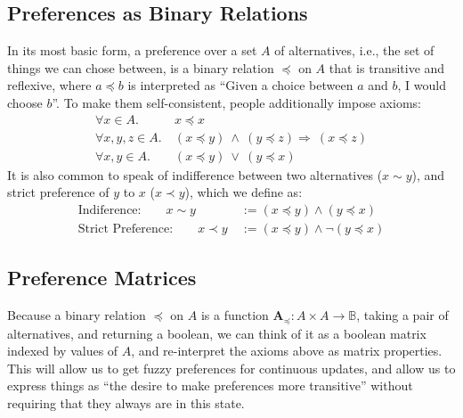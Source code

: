 \documentclass{article}
\theoremstyle{plain}
\theoremstyle{definition}
\theoremstyle{remark}
\newcommand\leqc{\preccurlyeq}
\newcommand\mat[1]{\mathbf #1}
\begin{document}
	\subsection{Preferences as Binary Relations}
	In its most basic form, a preference over a set $A$ of alternatives, i.e., the set of things we can chose between, is a binary relation $\leqc$ on $A$ that is transitive and reflexive, where $a \leqc b$ is interpreted as ``Given a choice between $a$ and $b$, I would choose $b$''. To make them self-consistent, people additionally impose axioms:
	\begin{align*}
	\forall x \in A.&~x \leqc x \tag{Reflexivity}\\
	\forall x,y,z \in A.&~(x\leqc y)~\land~( y \leqc z) \Rightarrow~(x \leqc z) \tag{Transitivity}\\
	\forall x, y \in A. &~ (x\leqc y)~\lor~( y \leqc x) \tag{Completeness}
	\end{align*}
	It is also common to speak of indifference between two alternatives ($x \sim y$), and strict preference of $y$ to $x$ ($x \prec y$), which we define as:
	\begin{align*}
		\text{Indiference:}\qquad x \sim y &~:= (x \leqc y) \land (y \leqc x)\\
		\text{Strict Preference:}\qquad x \prec y &~:= (x \leqc y) \land \lnot (y \leqc x)
	\end{align*}
	
	\subsection{Preference Matrices}
	Because a binary relation $\leqc$ on $A$ is a function $\mat A_\leqc: A \times A \to \mathbb{B}$, taking a pair of alternatives, and returning a boolean, we can think of it as a boolean matrix indexed by values of $A$, and re-interpret the axioms above as matrix properties. This will allow us to get fuzzy preferences for continuous updates, and allow us to express things as ``the desire to make preferences more transitive'' without requiring that they always are in this state. 
	
\end{document}
